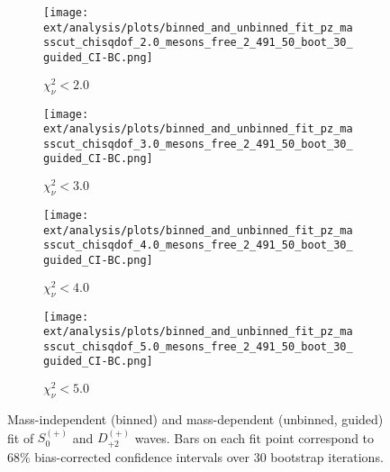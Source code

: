 \begin{figure}[htbp]
    \centering
    \begin{subfigure}{0.45\textwidth}
        \texttt{[image: ext/analysis/plots/binned\_and\_unbinned\_fit\_pz\_masscut\_chisqdof\_2.0\_mesons\_free\_2\_491\_50\_boot\_30\_guided\_CI-BC.png]}
        \caption{$\chi^2_\nu < 2.0$}
    \end{subfigure}
    \hfill
    \begin{subfigure}{0.45\textwidth}
        \texttt{[image: ext/analysis/plots/binned\_and\_unbinned\_fit\_pz\_masscut\_chisqdof\_3.0\_mesons\_free\_2\_491\_50\_boot\_30\_guided\_CI-BC.png]}
        \caption{$\chi^2_\nu < 3.0$}
    \end{subfigure}
    \vspace{1em}
    \begin{subfigure}{0.45\textwidth}
        \texttt{[image: ext/analysis/plots/binned\_and\_unbinned\_fit\_pz\_masscut\_chisqdof\_4.0\_mesons\_free\_2\_491\_50\_boot\_30\_guided\_CI-BC.png]}
        \caption{$\chi^2_\nu < 4.0$}
    \end{subfigure}
    \hfill
    \begin{subfigure}{0.45\textwidth}
        \texttt{[image: ext/analysis/plots/binned\_and\_unbinned\_fit\_pz\_masscut\_chisqdof\_5.0\_mesons\_free\_2\_491\_50\_boot\_30\_guided\_CI-BC.png]}
        \caption{$\chi^2_\nu < 5.0$}
    \end{subfigure}

    \caption{Mass-independent (binned) and mass-dependent (unbinned, guided) fit of $S_{0}^{(+)}$ and $D_{+2}^{(+)}$ waves. Bars on each fit point correspond to $68\%$ bias-corrected confidence intervals over $ 30 $ bootstrap iterations.}
    \label{fig:unbinned-guided-fit-all-Sp-D2p}
\end{figure}

